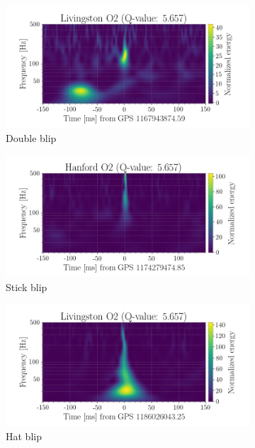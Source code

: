 \documentclass[a4paper]{article}
\begin{document}
\begin{figure}[h!]
\begin{subfigure}{.49\textwidth}
		\centering
		\includegraphics[width=1\linewidth]{double_O2}
		\caption{Double blip}
		\label{fig:double_O2}
	\end{subfigure}
	\begin{subfigure}{.49\textwidth}
		\centering
		\includegraphics[width=1\linewidth]{stick_O2}
		\caption{Stick blip}
		\label{fig:stick_O2}
	\end{subfigure}
	\begin{subfigure}{.49\textwidth}
		\centering
		\includegraphics[width=1\linewidth]{hat_O2}
		\caption{Hat blip}
		\label{fig:hat_O2}
	\end{subfigure}
	\begin{subfigure}{.49\textwidth}

\end{subfigure}
\end{figure}
\end{document}
